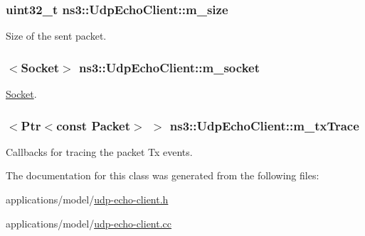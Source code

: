 \subsubsection[{\texorpdfstring{m\+\_\+size}{m_size}}]{\setlength{\rightskip}{0pt plus 5cm}uint32\+\_\+t ns3\+::\+Udp\+Echo\+Client\+::m\+\_\+size\hspace{0.3cm}{\ttfamily [private]}}\hypertarget{classns3_1_1UdpEchoClient_a5d4e4cd4fc2479c9b87207c9bbc4b7c8}{}\label{classns3_1_1UdpEchoClient_a5d4e4cd4fc2479c9b87207c9bbc4b7c8}


Size of the sent packet. 

\subsubsection[{\texorpdfstring{m\+\_\+socket}{m_socket}}]{$<${\bf Socket}$>$ ns3\+::\+Udp\+Echo\+Client\+::m\+\_\+socket\hspace{0.3cm}{\ttfamily [private]}}\hypertarget{classns3_1_1UdpEchoClient_a3742503e4126bff0e0498ffdf7d84533}{}\label{classns3_1_1UdpEchoClient_a3742503e4126bff0e0498ffdf7d84533}


\hyperlink{classns3_1_1Socket}{Socket}. 

\subsubsection[{\texorpdfstring{m\+\_\+tx\+Trace}{m_txTrace}}]{$<${\bf Ptr}$<$const {\bf Packet}$>$ $>$ ns3\+::\+Udp\+Echo\+Client\+::m\+\_\+tx\+Trace\hspace{0.3cm}{\ttfamily [private]}}\hypertarget{classns3_1_1UdpEchoClient_aaa176c93342f61d89a4479080dfba1f9}{}\label{classns3_1_1UdpEchoClient_aaa176c93342f61d89a4479080dfba1f9}


Callbacks for tracing the packet Tx events. 



The documentation for this class was generated from the following files\+:\begin{DoxyCompactItemize}
\item 
applications/model/\hyperlink{udp-echo-client_8h}{udp-\/echo-\/client.\+h}\item 
applications/model/\hyperlink{udp-echo-client_8cc}{udp-\/echo-\/client.\+cc}\end{DoxyCompactItemize}
